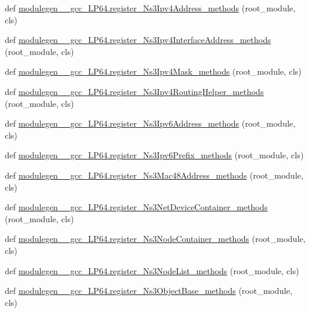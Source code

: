 \begin{DoxyCompactItemize}
\item 
def \hyperlink{namespacemodulegen____gcc__LP64_a52c7eb3519820103a7ff4aaf269a6c89}{modulegen\+\_\+\+\_\+gcc\+\_\+\+L\+P64.\+register\+\_\+\+Ns3\+Ipv4\+Address\+\_\+methods} (root\+\_\+module, cls)
\item 
def \hyperlink{namespacemodulegen____gcc__LP64_ab9793a525e51129c8830f907cac6a681}{modulegen\+\_\+\+\_\+gcc\+\_\+\+L\+P64.\+register\+\_\+\+Ns3\+Ipv4\+Interface\+Address\+\_\+methods} (root\+\_\+module, cls)
\item 
def \hyperlink{namespacemodulegen____gcc__LP64_abfab99a01a92901ea710a50ce313c67c}{modulegen\+\_\+\+\_\+gcc\+\_\+\+L\+P64.\+register\+\_\+\+Ns3\+Ipv4\+Mask\+\_\+methods} (root\+\_\+module, cls)
\item 
def \hyperlink{namespacemodulegen____gcc__LP64_a54ad3edaf1bb77380ce853aac009d3df}{modulegen\+\_\+\+\_\+gcc\+\_\+\+L\+P64.\+register\+\_\+\+Ns3\+Ipv4\+Routing\+Helper\+\_\+methods} (root\+\_\+module, cls)
\item 
def \hyperlink{namespacemodulegen____gcc__LP64_adadace4a2a2a7b40dbbc479c719515d9}{modulegen\+\_\+\+\_\+gcc\+\_\+\+L\+P64.\+register\+\_\+\+Ns3\+Ipv6\+Address\+\_\+methods} (root\+\_\+module, cls)
\item 
def \hyperlink{namespacemodulegen____gcc__LP64_aabc084fc7c70fffda3389dc15cd95031}{modulegen\+\_\+\+\_\+gcc\+\_\+\+L\+P64.\+register\+\_\+\+Ns3\+Ipv6\+Prefix\+\_\+methods} (root\+\_\+module, cls)
\item 
def \hyperlink{namespacemodulegen____gcc__LP64_aa406a8e967bb0e5456a51fcef1ec276b}{modulegen\+\_\+\+\_\+gcc\+\_\+\+L\+P64.\+register\+\_\+\+Ns3\+Mac48\+Address\+\_\+methods} (root\+\_\+module, cls)
\item 
def \hyperlink{namespacemodulegen____gcc__LP64_a43937d11569618c76bf10e334e87f976}{modulegen\+\_\+\+\_\+gcc\+\_\+\+L\+P64.\+register\+\_\+\+Ns3\+Net\+Device\+Container\+\_\+methods} (root\+\_\+module, cls)
\item 
def \hyperlink{namespacemodulegen____gcc__LP64_afc1115291cc5820268d802870956928d}{modulegen\+\_\+\+\_\+gcc\+\_\+\+L\+P64.\+register\+\_\+\+Ns3\+Node\+Container\+\_\+methods} (root\+\_\+module, cls)
\item 
def \hyperlink{namespacemodulegen____gcc__LP64_a2c92cb42c524377d6ebd963e1372f6cd}{modulegen\+\_\+\+\_\+gcc\+\_\+\+L\+P64.\+register\+\_\+\+Ns3\+Node\+List\+\_\+methods} (root\+\_\+module, cls)
\item 
def \hyperlink{namespacemodulegen____gcc__LP64_a811b76d9911bfa2ed025b14b9a8aeb50}{modulegen\+\_\+\+\_\+gcc\+\_\+\+L\+P64.\+register\+\_\+\+Ns3\+Object\+Base\+\_\+methods} (root\+\_\+module, cls)

\end{DoxyCompactItemize}
